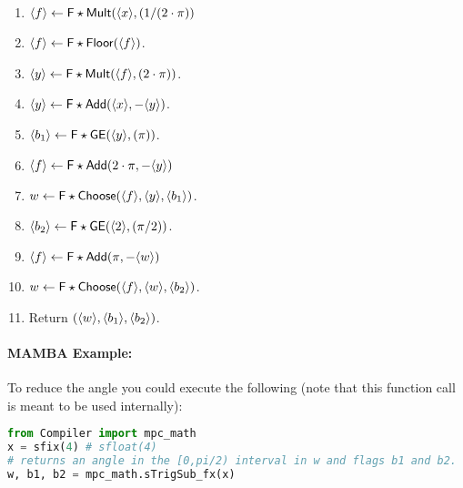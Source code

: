 \begin{enumerate}

\item $\langle f \rangle \leftarrow \mathsf{F\star Mult}(\langle x \rangle,(1 /(2 \cdot \pi))$
\item $\langle f \rangle \leftarrow \mathsf{F\star Floor}(\langle f \rangle)$.
\item $\langle y \rangle \leftarrow \mathsf{F\star Mult}(\langle f \rangle,(2 \cdot \pi ))$.
\item $\langle y \rangle \leftarrow \mathsf{F\star Add}(\langle x \rangle,-\langle y \rangle)$.
\item $\langle b_1 \rangle \leftarrow \mathsf{F\star GE}(\langle y \rangle,(\pi))$.
\item $\langle f \rangle \leftarrow \mathsf{F\star Add}(2 \cdot \pi,-\langle y \rangle)$
\item $w \leftarrow \mathsf{F\star Choose}(\langle f \rangle,\langle y \rangle, \langle b_1 \rangle)$.
\item $\langle b_2 \rangle \leftarrow \mathsf{F\star GE}(\langle 2 \rangle,(\pi / 2))$.
\item $\langle f \rangle \leftarrow \mathsf{F\star Add}( \pi,-\langle w \rangle)$
\item $w \leftarrow \mathsf{F\star Choose}(\langle f \rangle,\langle w \rangle, \langle b_2 \rangle)$.
\item Return $(\langle w \rangle,\langle b_1 \rangle,\langle b_2 \rangle)$.

\end{enumerate}

\paragraph{MAMBA Example:} To reduce the angle you could execute the following (note that this function call is meant to be used internally):
\begin{lstlisting}[language={python}]
from Compiler import mpc_math
x = sfix(4) # sfloat(4)
# returns an angle in the [0,pi/2) interval in w and flags b1 and b2. 
w, b1, b2 = mpc_math.sTrigSub_fx(x)
\end{lstlisting}


